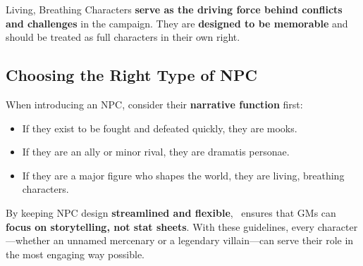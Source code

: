 Living, Breathing Characters \textbf{serve as the driving force behind conflicts and challenges} in the campaign. They are \textbf{designed to be memorable} and should be treated as full characters in their own right.

\subsection{Choosing the Right Type of NPC}

When introducing an NPC, consider their \textbf{narrative function} first:
\begin{itemize}
    \item If they exist to be fought and defeated quickly, they are mooks.
    \item If they are an ally or minor rival, they are dramatis personae.
    \item If they are a major figure who shapes the world, they are living, breathing characters.
\end{itemize}

By keeping NPC design \textbf{streamlined and flexible}, \wyrd\ ensures that GMs can \textbf{focus on storytelling, not stat sheets}. With these guidelines, every character—whether an unnamed mercenary or a legendary villain—can serve their role in the most engaging way possible.

